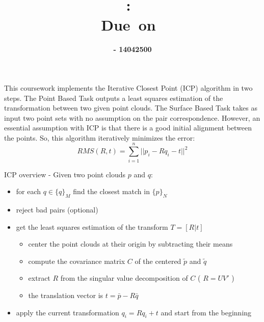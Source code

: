 \documentclass{article}
\title{
\vspace{2in}
\textmd{\textbf{\hmwkClass:\ \hmwkTitle}}\\
\normalsize\vspace{0.1in}\small{Due\ on\ \hmwkDueDate}\\
\vspace{3in}
}
\author{\textbf{\hmwkAuthorName  - 14042500}}
\date{} %
\begin{document}
\maketitle



\newpage

This coursework implements the Iterative Closest Point (ICP) algorithm in two steps. The Point Based Task outputs a least squares estimation of the transformation between two given point clouds. The Surface Based Task takes as input two point sets with no assumption on the pair correspondence. However, an essential assumption with ICP is that there is a good initial alignment between the points. So, this algorithm iteratively minimizes the error:\\

\begin{equation}
RMS(R,t) = \sum_{i=1}^{n} || p_i - R  q_i - t ||^2
\end{equation}

ICP overview - Given two point clouds $p$ and $q$:
\begin{itemize}
  \item for each $q \in \{q\}_M$ find the closest match in $\{p\}_N$
  \item reject bad pairs (optional)
  \item get the least squares estimation of the transform $T = [R | t]$
  \begin{itemize}
 	 \item center the point clouds at their origin by subtracting their means
 	 \item compute the covariance matrix $C$ of the centered $ \tilde{p}$ and $ \tilde{q}$ 
 	 \item extract $R$ from the singular value decomposition of $C$ ( $R = U V'$ )
  	 \item the translation vector is $t = \bar{p} - R \bar{q}$
  \end{itemize}
  \item apply the current transformation $q_i = R q_i + t$ and start from the beginning
\end{itemize} 
\end{document}
